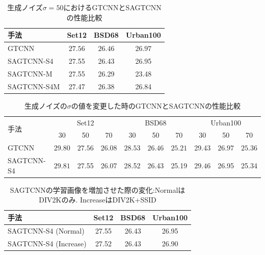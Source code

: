 \begin{table}[htbp]
\centering
\caption{生成ノイズ$\sigma=50$におけるGTCNNとSAGTCNNの性能比較 \label{tab:sigma50}}
 \begin{tabular}{|l||c|c|c|}
 \hline
 手法 & Set12 & BSD68 & Urban100 \\ \hline \hline
 GTCNN         & $\bm{27.56}$ & $\bm{26.46}$ & $\bm{26.97}$ \\ \hline
 SAGTCNN-S4    & 27.55 & 26.43 & 26.95 \\ \hline
 SAGTCNN-M     & 27.55 & 26.29 & 23.48 \\ \hline
 SAGTCNN-S4M   & 27.47 & 26.38 & 26.84 \\ \hline
 \end{tabular}
\end{table}


\begin{table}[htbp]
\centering
\caption{生成ノイズの$\sigma$の値を変更した時のGTCNNとSAGTCNNの性能比較 \label{tab:sigmaxx}}
\setlength\tabcolsep{1.5pt}
 \begin{tabular}{|l|c|c|c|c|c|c|c|c|c|}
\hline
\multirow{2}{*}{手法} &  \multicolumn{3}{c|}{Set12} &  \multicolumn{3}{c|}{BSD68} &  \multicolumn{3}{c|}{Urban100}   \\
\cline{2-10}
 & 30 & 50 & 70  & 30 & 50 & 70  & 30 & 50 & 70 \\
\hline \hline
GTCNN & 29.80 
            & $\bm{27.56}$ 
                & $\bm{26.08}$ 
                    
                    & $\bm{28.53}$ 
                        & $\bm{26.46}$ 
                            & $\bm{25.21}$ 
                            
                                & 29.43 
                                    & $\bm{26.97}$ 
                                        & $\bm{25.36}$ \\ \hline
SAGTCNN-S4    & $\bm{29.81}$ 
                &  27.55 
                    & 26.07 
                    
                    & 28.52 
                        & 26.43 
                            & 25.19 
                                
                                & $\bm{29.46}$ 
                                    & 26.95 
                                        & 25.34 \\ \hline
 \end{tabular}
\end{table}

\begin{table}[htbp]
\centering
\caption{SAGTCNNの学習画像を増加させた際の変化:NormalはDIV2Kのみ. IncreaseはDIV2K+SSID \label{tab:manyImage}}
 \begin{tabular}{|l||c|c|c|}
 \hline
 手法 & Set12 & BSD68 & Urban100 \\ \hline \hline
 SAGTCNN-S4 (Normal)        & 27.55 & 26.43 & 26.95 \\ \hline
 SAGTCNN-S4 (Increase)     & 27.52 & 26.43 & 26.90 \\ \hline
 \end{tabular}
\end{table}



